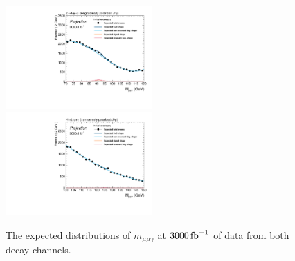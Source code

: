 \begin{figure}[!ht]
\begin{center}
	  \includegraphics[width=0.5\textwidth]{Fig/projection/ZJpsiG_data_Inclusive_cat1_longipolarized_proj_3000invfb}~
	  \includegraphics[width=0.5\textwidth]{Fig/projection/HJpsiG_data_Inclusive_cat1_transpolarized_proj_3000invfb}\\
	  \caption{The expected distributions of $m_{\mu\mu\gamma}$ at $3000\mbox{\ensuremath{\,\text{fb}^\text{$-$1}}}$ of data from both decay channels.\label{fig:projection}}
\end{center}
\end{figure}
